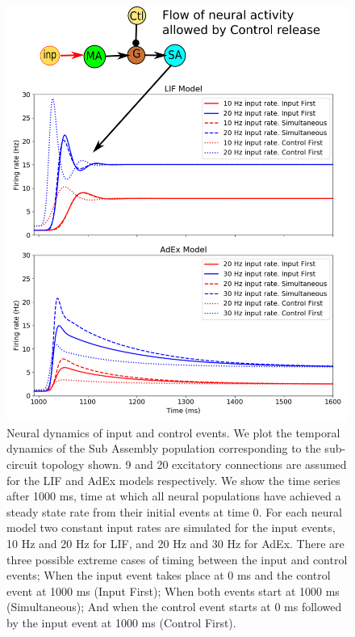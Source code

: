 \documentclass[10pt]{article}
\begin{document}
\begin{figure}[h!]
  \begin{center}
    \includegraphics[width=1.0\columnwidth]{figures/control_subcircuit}

    \caption{Neural dynamics of input and control events.
We plot the temporal dynamics of the Sub Assembly population corresponding to the sub-circuit topology shown.
9 and 20 excitatory connections are assumed for the LIF and AdEx models respectively.
We show the time series after 1000 ms, time at which all neural populations have achieved a steady state rate from their initial events at time 0.
For each neural model two constant input rates are simulated for the input events, 10 Hz and 20 Hz for LIF, and 20 Hz and 30 Hz for AdEx.
There are three possible extreme cases of timing between the input and control events;
When the input event takes place at 0 ms and the control event at 1000 ms (Input First);
When both events start at 1000 ms (Simultaneous);
And when the control event starts at 0 ms followed by the input event at 1000 ms (Control First).
}
    \label{fig:experiment-2}
  \end{center}
\end{figure}
\end{document}
